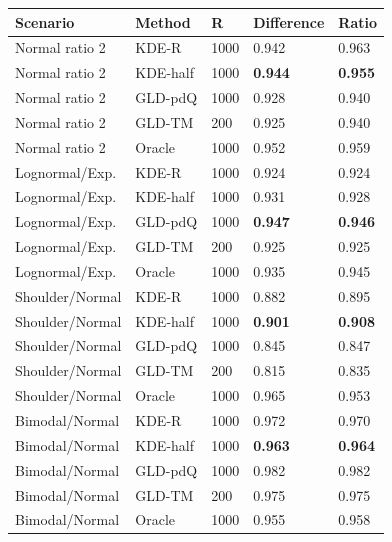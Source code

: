 \begin{tabular}{lllll}
\toprule
Scenario & Method & R & Difference & Ratio \\
\midrule
Normal ratio 2 & KDE-R & 1000 & 0.942 & 0.963 \\
Normal ratio 2 & KDE-half & 1000 & \textbf{0.944} & \textbf{0.955} \\
Normal ratio 2 & GLD-pdQ & 1000 & 0.928 & 0.940 \\
Normal ratio 2 & GLD-TM & 200 & 0.925 & 0.940 \\
Normal ratio 2 & Oracle & 1000 & 0.952 & 0.959 \\
Lognormal/Exp. & KDE-R & 1000 & 0.924 & 0.924 \\
Lognormal/Exp. & KDE-half & 1000 & 0.931 & 0.928 \\
Lognormal/Exp. & GLD-pdQ & 1000 & \textbf{0.947} & \textbf{0.946} \\
Lognormal/Exp. & GLD-TM & 200 & 0.925 & 0.925 \\
Lognormal/Exp. & Oracle & 1000 & 0.935 & 0.945 \\
Shoulder/Normal & KDE-R & 1000 & 0.882 & 0.895 \\
Shoulder/Normal & KDE-half & 1000 & \textbf{0.901} & \textbf{0.908} \\
Shoulder/Normal & GLD-pdQ & 1000 & 0.845 & 0.847 \\
Shoulder/Normal & GLD-TM & 200 & 0.815 & 0.835 \\
Shoulder/Normal & Oracle & 1000 & 0.965 & 0.953 \\
Bimodal/Normal & KDE-R & 1000 & 0.972 & 0.970 \\
Bimodal/Normal & KDE-half & 1000 & \textbf{0.963} & \textbf{0.964} \\
Bimodal/Normal & GLD-pdQ & 1000 & 0.982 & 0.982 \\
Bimodal/Normal & GLD-TM & 200 & 0.975 & 0.975 \\
Bimodal/Normal & Oracle & 1000 & 0.955 & 0.958 \\
\bottomrule
\end{tabular}
